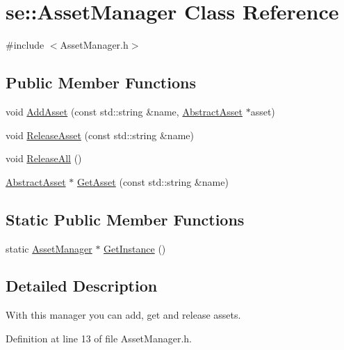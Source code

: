\hypertarget{classse_1_1_asset_manager}{}\section{se\+:\+:Asset\+Manager Class Reference}
\label{classse_1_1_asset_manager}


{\ttfamily \#include $<$Asset\+Manager.\+h$>$}

\subsection*{Public Member Functions}
\begin{DoxyCompactItemize}
\item 
void \mbox{\hyperlink{classse_1_1_asset_manager_aee43a38dbf19e852fed3f222808277af}{Add\+Asset}} (const std\+::string \&name, \mbox{\hyperlink{classse_1_1_abstract_asset}{Abstract\+Asset}} $\ast$asset)
\item 
void \mbox{\hyperlink{classse_1_1_asset_manager_a3cd3506b7003d63adbd1cd0f94c8931e}{Release\+Asset}} (const std\+::string \&name)
\item 
void \mbox{\hyperlink{classse_1_1_asset_manager_ada6844330b41f132c000b4f96657a0ac}{Release\+All}} ()
\item 
\mbox{\hyperlink{classse_1_1_abstract_asset}{Abstract\+Asset}} $\ast$ \mbox{\hyperlink{classse_1_1_asset_manager_a24773ae49ec73911e46fbe0e1dce526d}{Get\+Asset}} (const std\+::string \&name)
\end{DoxyCompactItemize}
\subsection*{Static Public Member Functions}
\begin{DoxyCompactItemize}
\item 
static \mbox{\hyperlink{classse_1_1_asset_manager}{Asset\+Manager}} $\ast$ \mbox{\hyperlink{classse_1_1_asset_manager_a9c1b0ad537778be7836568fdef953b05}{Get\+Instance}} ()
\end{DoxyCompactItemize}


\subsection{Detailed Description}
With this manager you can add, get and release assets. 

Definition at line 13 of file Asset\+Manager.\+h.



